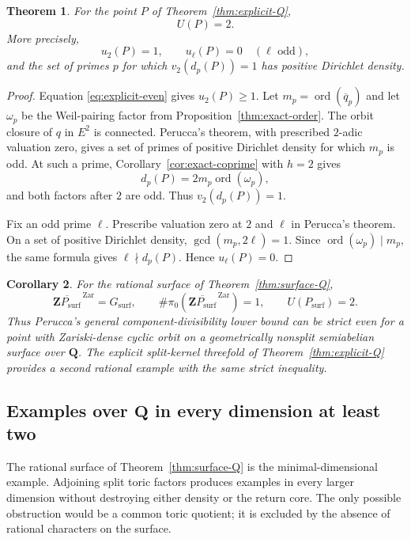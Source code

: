 \documentclass[11pt,letterpaper,reqno]{amsart}
\newtheorem{theorem}{Theorem}[section]
\newtheorem{corollary}[theorem]{Corollary}
\theoremstyle{definition}
\theoremstyle{remark}
\newcommand{\Q}{\mathbf Q}
\newcommand{\ord}{\operatorname{ord}}
\newcommand{\Zar}{\mathrm{Zar}}
\begin{document}
\begin{theorem}
\label{thm:U-equals-2}
For the point $P$ of Theorem~\ref{thm:explicit-Q},
\[
 U(P)=2.
\]
More precisely,
\[
 u_2(P)=1,
 \qquad u_\ell(P)=0\quad(\ell\text{ odd}),
\]
and the set of primes $p$ for which $v_2(d_p(P))=1$ has positive Dirichlet
density.
\end{theorem}

\begin{proof}
Equation \eqref{eq:explicit-even} gives $u_2(P)\ge1$.  Let
$m_p=\ord(\overline q_p)$ and let $\omega_p$ be the Weil-pairing factor from
Proposition~\ref{thm:exact-order}.  The orbit closure of $q$ in $E^2$ is connected.
Perucca's theorem, with prescribed $2$-adic valuation zero, gives a set of
primes of positive Dirichlet density for which $m_p$ is odd.  At such a prime,
Corollary~\ref{cor:exact-coprime} with $h=2$ gives
\[
 d_p(P)=2m_p\ord(\omega_p),
\]
and both factors after $2$ are odd.  Thus $v_2(d_p(P))=1$.

Fix an odd prime $\ell$.  Prescribe valuation zero at $2$ and $\ell$ in
Perucca's theorem.  On a set of positive Dirichlet density,
$\gcd(m_p,2\ell)=1$.  Since $\ord(\omega_p)\mid m_p$, the same formula gives
$\ell\nmid d_p(P)$.  Hence $u_\ell(P)=0$.
\end{proof}

\begin{corollary}
\label{cor:component-failure}
For the rational surface of Theorem~\ref{thm:surface-Q},
\[
 \overline{\mathbf ZP_{\mathrm{surf}}}^{\,\Zar}=G_{\mathrm{surf}},
 \qquad
 \#\pi_0\!\left(
 \overline{\mathbf ZP_{\mathrm{surf}}}^{\,\Zar}
 \right)=1,
 \qquad
 U(P_{\mathrm{surf}})=2.
\]
Thus Perucca's general component-divisibility lower bound can be strict even
for a point with Zariski-dense cyclic orbit on a geometrically nonsplit
semiabelian surface over $\Q$.  The explicit split-kernel threefold of Theorem~\ref{thm:explicit-Q}
provides a second rational example with the same strict inequality.
\end{corollary}


\subsection{Examples over \texorpdfstring{$\Q$}{Q} in every dimension at least two}

The rational surface of Theorem~\ref{thm:surface-Q} is the minimal-dimensional
example.  Adjoining split toric factors produces examples in every larger
dimension without destroying either density or the return core.  The only
possible obstruction would be a common toric quotient; it is excluded by the
absence of rational characters on the surface.
\end{document}
